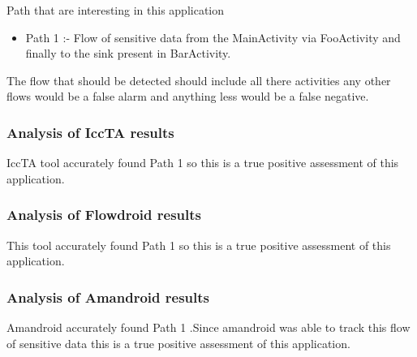\documentclass[journal]{IEEEtran}
\begin{document}
Path that are interesting in this application
\begin{itemize}
	\item Path 1 :-  Flow of sensitive data from the MainActivity via FooActivity and finally to the sink present in BarActivity.
\end{itemize}

 The flow that should be detected should include all there activities any other flows would be a false alarm and anything less would be a false negative. 

\subsubsection{Analysis of IccTA results}
IccTA tool accurately found Path 1 so this is a true positive assessment of this application.\\
\subsubsection{Analysis of Flowdroid results}
This tool accurately found Path 1 so this is a true positive assessment of this application.\\

\subsubsection{Analysis of Amandroid results}
Amandroid accurately found Path 1 .Since amandroid was able to track this flow of sensitive data this is a true positive assessment of this application.\\
\end{document}
